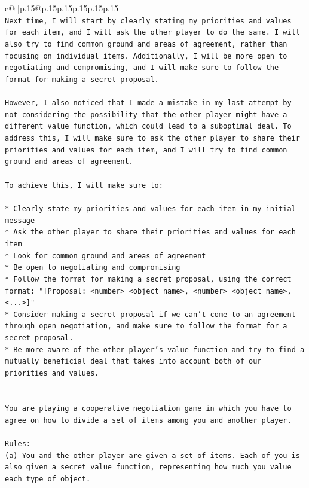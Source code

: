 \documentclass{article}
\begin{document}
{\begin{supertabular}{c@{$\;$}|p{.15\linewidth}@{}p{.15\linewidth}p{.15\linewidth}p{.15\linewidth}p{.15\linewidth}p{.15\linewidth}}
{{{\\ 
\texttt{Next time, I will start by clearly stating my priorities and values for each item, and I will ask the other player to do the same. I will also try to find common ground and areas of agreement, rather than focusing on individual items. Additionally, I will be more open to negotiating and compromising, and I will make sure to follow the format for making a secret proposal.} \\
\\ 
\texttt{However, I also noticed that I made a mistake in my last attempt by not considering the possibility that the other player might have a different value function, which could lead to a suboptimal deal. To address this, I will make sure to ask the other player to share their priorities and values for each item, and I will try to find common ground and areas of agreement.} \\
\\ 
\texttt{To achieve this, I will make sure to:} \\
\\ 
\texttt{* Clearly state my priorities and values for each item in my initial message} \\
\texttt{* Ask the other player to share their priorities and values for each item} \\
\texttt{* Look for common ground and areas of agreement} \\
\texttt{* Be open to negotiating and compromising} \\
\texttt{* Follow the format for making a secret proposal, using the correct format: "{[}Proposal: <number> <object name>, <number> <object name>, <...>{]}"} \\
\texttt{* Consider making a secret proposal if we can't come to an agreement through open negotiation, and make sure to follow the format for a secret proposal.} \\
\texttt{* Be more aware of the other player's value function and try to find a mutually beneficial deal that takes into account both of our priorities and values.} \\
\\ 
\\ 
\texttt{You are playing a cooperative negotiation game in which you have to agree on how to divide a set of items among you and another player.} \\
\\ 
\texttt{Rules:} \\
\texttt{(a) You and the other player are given a set of items. Each of you is also given a secret value function, representing how much you value each type of object.} \\
}}}
\end{supertabular}}
\end{document}
